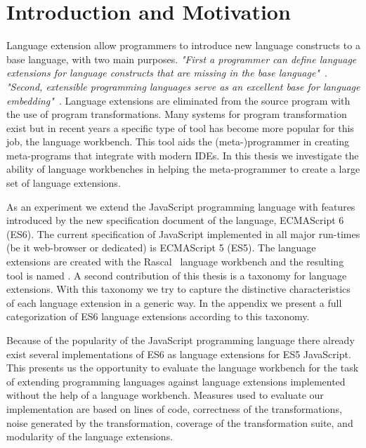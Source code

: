 
\chapter{Introduction and Motivation}

\label{Chapter1}


Language extension allow programmers to introduce new language constructs to a base language, with two main purposes. \textit{"First a programmer can define language extensions for language constructs that are missing in the base language"}~\cite{Erdweg2013}. \textit{"Second, extensible programming languages serve as an excellent base for language embedding"}~\cite{Erdweg2013}. Language extensions are eliminated from the source program with the use of program transformations. Many systems for program transformation exist but in recent years a specific type of tool has become more popular for this job, the language workbench. This tool aids the (meta-)programmer in creating meta-programs that integrate with modern IDEs. In this thesis we investigate the ability of language workbenches in helping the meta-programmer to create a large set of language extensions. 

As an experiment we extend the JavaScript programming language with features introduced by the new specification document of the language, ECMAScript 6 (ES6). The current specification of JavaScript implemented in all major run-times (be it web-browser or dedicated) is ECMAScript 5 (ES5). The language extensions are created with the Rascal~\cite{Klinta} language workbench and the resulting tool is named \projectname. A second contribution of this thesis is a taxonomy for language extensions. With this taxonomy we try to capture the distinctive characteristics of each language extension in a generic way. In the appendix we present a full categorization of ES6 language extensions according to this taxonomy. 

Because of the popularity of the JavaScript programming language there already exist several implementations of ES6 as language extensions for ES5 JavaScript. This presents us the opportunity to evaluate the language workbench for the task of extending programming languages against language extensions implemented without the help of a language workbench.  
Measures used to evaluate our implementation are based on lines of code, correctness of the transformations, noise generated by the transformation, coverage of the transformation suite, and modularity of the language extensions.

